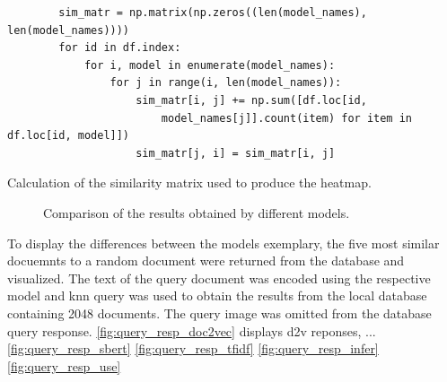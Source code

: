 \begin{listing}[htp]
    \begin{verbatim}
        sim_matr = np.matrix(np.zeros((len(model_names), len(model_names))))
        for id in df.index:
            for i, model in enumerate(model_names):
                for j in range(i, len(model_names)):
                    sim_matr[i, j] += np.sum([df.loc[id, 
                        model_names[j]].count(item) for item in df.loc[id, model]])
                    sim_matr[j, i] = sim_matr[i, j]
    \end{verbatim}
    \caption{Calculation of the similarity matrix used to produce the heatmap.
    }
    \label{lst:sim-matrix}
\end{listing}

\begin{figure}%
    \centering
    \qquad
    \caption[Comparison of models]{Comparison of the results obtained by different models.}%
    \label{fig:comparison-models}%
\end{figure}


To display the differences between the models exemplary, the five most similar docuemnts to a random document were returned from the database and visualized.
The text of the query document was encoded using the respective model and \ac{knn} query was used to obtain the results from the local database containing 2048 documents.
The query image was omitted from the database query response.
\autoref{fig:query_resp_doc2vec} displays \ac{d2v} reponses, ... 
\autoref{fig:query_resp_sbert}
\autoref{fig:query_resp_tfidf}
\autoref{fig:query_resp_infer}
\autoref{fig:query_resp_use}

